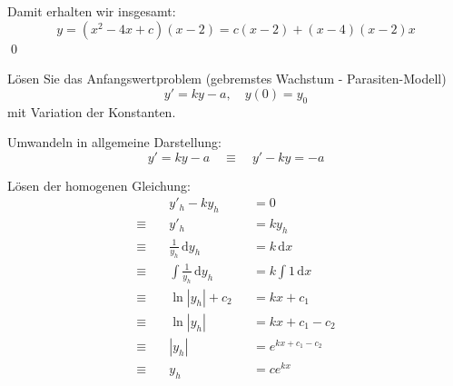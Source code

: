 \documentclass[answers]{exam}
\newcommand{\abs}[1]{\left| #1 \right|}
\renewcommand{\d}{\,\mathrm{d}}
\begin{document}
\begin{questions}
\begin{solution}
        Damit erhalten wir insgesamt:
        $$
            y = (x^2 - 4x + c)(x-2) = c(x-2) + (x-4)(x-2)x
        $$\qed
    \end{solution}

    \newpage
    \question
    Lösen Sie das Anfangswertproblem (gebremstes Wachstum - Parasiten-Modell)
    $$
        y' = ky - a, \quad y(0) = y_0
    $$
    mit Variation der Konstanten.
    \begin{solution}
        Umwandeln in allgemeine Darstellung:
        $$
            y' = ky - a \quad \equiv \quad y' - ky = - a
        $$

        Lösen der homogenen Gleichung:
        $$
            \begin{aligned}
                             & y'_h - ky_h               &  & = 0                  \\
                \equiv \quad & y'_h                      &  & = ky_h               \\
                \equiv \quad & \frac{1}{y_h} \d y_h      &  & = k \d x             \\
                \equiv \quad & \int \frac{1}{y_h} \d y_h &  & = k\int 1 \d x       \\
                \equiv \quad & \ln\abs{y_h} + c_2        &  & = kx + c_1           \\
                \equiv \quad & \ln\abs{y_h}              &  & = kx + c_1 - c_2     \\
                \equiv \quad & \abs{y_h}                 &  & = e^{kx + c_1 - c_2} \\
                \equiv \quad & y_h                       &  & = ce^{kx}
            \end{aligned}
        $$


\end{solution}
\end{questions}
\end{document}

